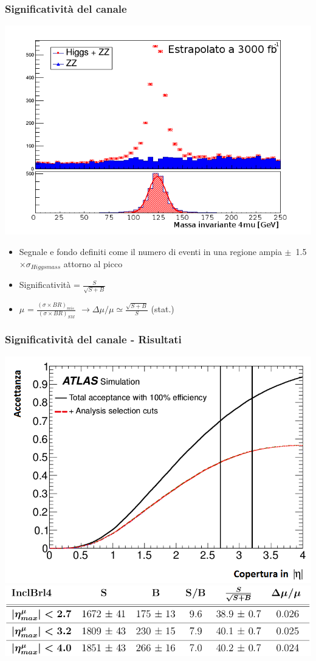 \documentclass{beamer}
\begin{document}
\begin{frame}[t]
\frametitle{Significativit\`a del canale}
\begin{center}
\includegraphics[width=.5\textwidth]{SBInclBrl4_2}
\end{center}

\begin{itemize}
\item \small Segnale e fondo definiti come il numero di eventi in una regione ampia
\mbox{$\pm$ 1.5 $\times \sigma_{Higgs mass}$} attorno al picco
\item \small Significativit\`a = $\frac{S}{\sqrt{S + B}}$
\item \small $\mu$ = $\frac{(\sigma \times BR)_{mis.}}{(\sigma \times BR)_{SM}}$ $\rightarrow 
\Delta\mu/\mu \simeq \frac{\sqrt{S + B}}{S}$ (stat.)
\end{itemize}
\end{frame}


\begin{frame}
\frametitle{Significativit\`a del canale - Risultati}
\centering
\includegraphics[width=.5\textwidth]{scopingAcceptance2}\\
\includegraphics[width=.9\textwidth]{significanceInclBrl4}\\
\begin{flushleft}
\end{flushleft}
\end{frame}
\end{document}

